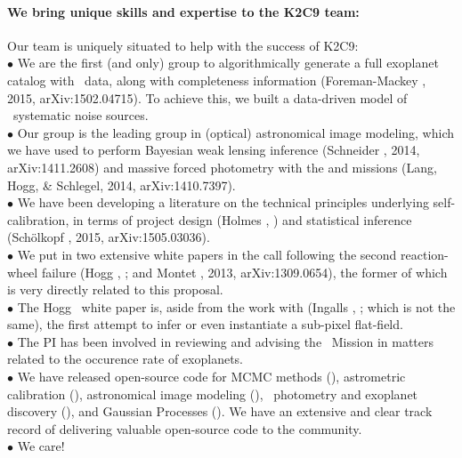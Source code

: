 \documentclass[12pt,preprint]{aastex}
\begin{document}
\paragraph{We bring unique skills and expertise to the K2C9 team:}

Our team is uniquely situated to help with the success of K2C9:\\
$\bullet$ We are the first (and only) group to algorithmically
generate a full exoplanet catalog with \ktwo\ data, along with
completeness information (Foreman-Mackey \etal, 2015,
arXiv:1502.04715).
To achieve this, we built a data-driven model of \ktwo\ systematic
noise sources.\\
$\bullet$ Our group is the leading group in (optical) astronomical
image modeling, which we have used to perform Bayesian weak lensing
inference (Schneider \etal, 2014, arXiv:1411.2608) and
massive forced photometry with the  and 
missions (Lang, Hogg, \& Schlegel, 2014,
arXiv:1410.7397).\\
$\bullet$ We have been developing a literature on the technical
principles underlying self-calibration, in terms of project design
(Holmes \etal, \opcit) and statistical inference
(Sch\"olkopf \etal, 2015, arXiv:1505.03036).\\
$\bullet$ We put in two extensive white papers in the call following
the second reaction-wheel failure (Hogg \etal, \opcit; and
Montet \etal, 2013, arXiv:1309.0654), the former of which is very directly
related to this proposal.\\
$\bullet$ The Hogg \etal\ white paper is, aside from the work with
\spitzer (Ingalls \etal, \opcit; which is not the same), the first attempt
to infer or even instantiate a sub-pixel flat-field.\\
$\bullet$ The PI has
been involved in reviewing and advising the \kepler\ Mission
in matters related to the occurence rate of exoplanets.\\
$\bullet$ We have released open-source code for MCMC methods
(), astrometric calibration (),
astronomical image modeling (), \ktwo\ photometry
and exoplanet discovery (), and Gaussian Processes
().  We have an extensive and clear track record of
delivering valuable open-source code to the community.\\
$\bullet$ We care!
\end{document}
